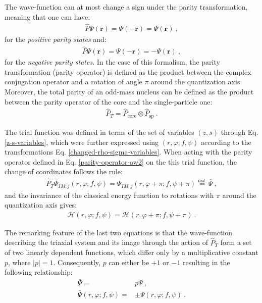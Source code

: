 The wave-function can at most change a sign under the parity transformation, meaning that one can have:
\begin{align}
    \hat{P}\Psi(\mathbf{r})=\Psi(-\mathbf{r})=\Psi(\mathbf{r})\ ,
\end{align}
for the \emph{positive parity states} and:
\begin{align}
    \hat{P}\Psi(\mathbf{r})=\Psi(-\mathbf{r})=-\Psi(\mathbf{r})\ ,
\end{align}
for the \emph{negative parity states}. In the case of this formalism, the parity transformation (parity operator) is defined as the product between the complex conjugation operator and a rotation of angle $\pi$ around the quantization axis. Moreover, the total parity of an odd-mass nucleus can be defined as the product between the parity operator of the core and the single-particle one:
\begin{align}
    \hat{P}_T=\hat{P}_\text{core}\otimes\hat{P}_\text{sp}\ .
    \label{parity-operator-aw2}
\end{align}

The trial function was defined in terms of the set of variables $(z,s)$  through Eq. \ref{z-s-variables}, which were further expressed using $(r,\varphi;f,\psi)$ according to the transformations Eq. \ref{changed-rho-sigma-variables}. When acting with the parity operator defined in Eq. \ref{parity-operator-aw2} on the this trial function, the change of coordinates follows the rule:
\begin{align}
    \hat{P}_T\Psi_{IM;j}(r,\varphi;f,\psi)=\Psi_{IM;j}(r,\varphi+\pi;f,\psi+\pi)\stackrel{not.}{=}\bar{\Psi}\ ,
\end{align}
and the invariance of the classical energy function to rotations with $\pi$ around the quantization axis gives:
\begin{align}
    \mathcal{H}(r,\varphi;f,\psi)=\mathcal{H}(r,\varphi+\pi;f,\psi+\pi)\ .
\end{align}

The remarking feature of the last two equations is that the wave-function describing the triaxial system and its image through the action of $\hat{P}_T$ form a set of two linearly dependent functions, which differ only by a multiplicative constant $p$, where $|p|=1$. Consequently, $p$ can either be $+1$ or $-1$ resulting in the following relationship:
\begin{align}
    \bar{\Psi}=&p\Psi\nonumber\ ,\\
    \bar{\Psi}(r,\varphi;f,\psi)=&\pm\Psi(r,\varphi;f,\psi)\ .
\end{align}

